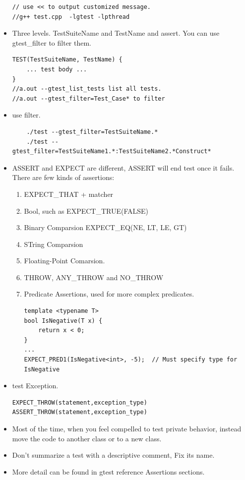 \documentclass[a4paper,11pt,twoside]{book}
\begin{document}
\begin{itemize}
\begin{lstlisting}
// use << to output customized message. 
//g++ test.cpp  -lgtest -lpthread
\end{lstlisting}

\item Three levels. TestSuiteName and TestName and assert. You can use gtest\_filter to filter them.

\begin{lstlisting}
TEST(TestSuiteName, TestName) {
	... test body ...
}
//a.out --gtest_list_tests list all tests.
//a.out --gtest_filter=Test_Case* to filter 
\end{lstlisting}

\item use filter.
\begin{lstlisting}
	./test --gtest_filter=TestSuiteName.*
	./test --gtest_filter=TestSuiteName1.*:TestSuiteName2.*Construct*
\end{lstlisting}


\item  ASSERT and EXPECT are different, ASSERT will end test once it fails. There are few kinds of assertions: 
\begin{enumerate}
	\item EXPECT\_THAT + matcher
	\item Bool, such as EXPECT\_TRUE(FALSE)
	\item Binary Comparsion EXPECT\_EQ(NE, LT, LE, GT)
	\item STring Comparsion
	\item Floating-Point Comarsion.
	\item THROW, ANY\_THROW and NO\_THROW
	\item Predicate Assertions, used for more complex predicates. 
\begin{lstlisting}
template <typename T>
bool IsNegative(T x) {
	return x < 0;
}
...
EXPECT_PRED1(IsNegative<int>, -5);  // Must specify type for IsNegative
\end{lstlisting}
\end{enumerate}

\item test Exception.
\begin{lstlisting}
EXPECT_THROW(statement,exception_type)
ASSERT_THROW(statement,exception_type)
\end{lstlisting}

\item Most of the time, when you feel compelled to test private behavior, instead move the code to another class or to a new class. 

\item Don't summarize a test with a descriptive comment, Fix its name. 

\item More detail can be found in gtest reference Assertions sections.
\end{itemize}
\end{document}
